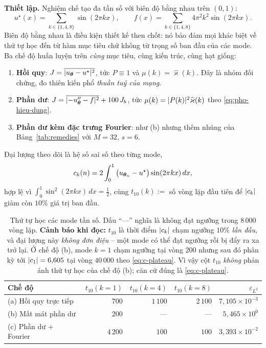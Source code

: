 \textbf{Thiết lập.} Nghiệm chế tạo đa tần số với biên độ bằng nhau trên $(0,1)$:
\begin{equation}
u^{\star}(x) = \sum_{k \in \{1,4,8\}} \sin(2\pi k x),
\qquad
f(x) = \sum_{k \in \{1,4,8\}} 4\pi^2 k^2 \sin(2\pi k x).
\label{eq:da-tan-so}
\end{equation}
Biên độ bằng nhau là điều kiện thiết kế then chốt: nó bảo đảm mọi khác biệt về
thứ tự học đến từ hàm mục tiêu chứ không từ trọng số ban đầu của các mode. Ba chế
độ huấn luyện trên \emph{cùng} mục tiêu, cùng kiến trúc, cùng hạt giống:
 
\begin{enumerate}[label=(\alph*),leftmargin=2.2em,itemsep=2pt]
\item \textbf{Hồi quy}: $J = \overline{\lvert u_{\bm{\theta}} - u^{\star}\rvert^2}$, tức
$P \equiv 1$ và $\mu(k) = \widehat{\varkappa}(k)$. Đây là nhóm đối chứng, đo
thiên kiến phổ \emph{thuần tuý của mạng}.
\item \textbf{Phần dư}: $J = \overline{\lvert-u_{\bm{\theta}}'' - f\rvert^2} + 100\,J_b$,
tức $\mu(k) = \lvert P(k)\rvert^2\widehat{\varkappa}(k)$ theo
\eqref{eq:pho-hieu-dung}.
\item \textbf{Phần dư kèm đặc trưng Fourier}: như (b) nhưng thêm nhúng của
Bảng~\ref{tab:remedies} với $M = 32$, $s = 6$.
\end{enumerate}
 
Đại lượng theo dõi là hệ số sai số theo từng mode,
\begin{equation}
c_k(n) = 2\int_0^1 \big(u_{\bm{\theta}_n} - u^{\star}\big)\sin(2\pi k x)\,dx,
\label{eq:he-so-mode}
\end{equation}
hợp lệ vì $\int_0^1\sin^2(2\pi kx)\,dx = \tfrac12$, cùng
$t_{10}(k) :=$ số vòng lặp đầu tiên để $\lvert c_k\rvert$ giảm còn $10\%$ giá trị ban
đầu.
 
\begin{table}[H]
\centering
\caption[Thứ tự học các mode tần số]{Thứ tự học các mode tần số. Dấu ``---''
nghĩa là không đạt ngưỡng trong $8\,000$ vòng lặp. \textbf{Cảnh báo khi đọc:}
$t_{10}$ là thời điểm $\lvert c_k\rvert$ chạm ngưỡng $10\%$ \emph{lần đầu}, và đại
lượng này \emph{không đơn điệu} -- một mode có thể đạt ngưỡng rồi bị đẩy ra xa
trở lại. Ở chế độ (b), mode $k=1$ chạm ngưỡng tại vòng $200$ nhưng sau đó phân
kỳ tới $\lvert c_1\rvert = 6{,}605$ tại vòng $40\,000$ theo \eqref{eq:c-plateau}. Vì
vậy cột $t_{10}$ \emph{không} phản ánh thứ tự học của chế độ (b); căn cứ đúng là
\eqref{eq:c-plateau}.}
\label{tab:tn3}
\small
\begin{tabular}{@{}lrrrr@{}}
\toprule
\textbf{Chế độ} & $t_{10}(k{=}1)$ & $t_{10}(k{=}4)$ & $t_{10}(k{=}8)$
& $\varepsilon_{L^2}$ \\
\midrule
(a) Hồi quy trực tiếp   & $700$    & $1\,100$ & $2\,100$
                        & $7{,}105\times10^{-3}$ \\
(b) Mất mát phần dư     & $200$    & ---      & ---
                        & $5{,}465\times10^{0}$ \\
(c) Phần dư + Fourier   & $4\,200$ & $100$    & $100$
                        & $3{,}393\times10^{-2}$ \\
\bottomrule
\end{tabular}
\end{table}
 
